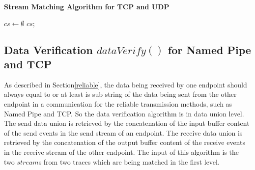 \begin{algorithm}[H]
\DontPrintSemicolon
\caption{{\bf Stream Matching Algorithm for TCP and UDP} \label{matchAlg2}}
$cs \leftarrow \emptyset$\; 
\KwRet $cs$;\;
\end{algorithm}

\subsection{Data Verification $dataVerify()$ for Named Pipe and TCP}
As described in Section\ref{reliable}, the data being received by one endpoint should always equal to or at least is sub string of the data being sent from the other endpoint in a communication for the reliable transmission methods, such as Named Pipe and TCP. So the data verification algorithm is in data union level. The send data union is retrieved by the concatenation of the input buffer content of the send events in the send stream of an endpoint. The receive data union is retrieved by the concatenation of the output buffer content of the receive events in the receive stream of the other endpoint. The input of this algorithm is the two $stream$s from two traces which are being matched in the first level.

